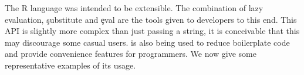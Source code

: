 \documentclass[review,nonacm,screen,acmsmall,anonymous=true]{acmart}
\newcommand{\mypara}[1]{\medskip\noindent\emph{#1}\xspace}
\newcommand{\authorcomment}[3]{\xspace\textcolor{#1}{{\bf #2} #3}\xspace}
\newcommand{\todo}[1]{\authorcomment{red}{TODO}{#1}}
\begin{document}













The R language was intended to be extensible. The combination of lazy
evaluation, \c{substitute} and \c{eval} are the tools given to
developers to this end. This API is slightly more complex than just
passing a string, it is conceivable that this may discourage some
casual users. \Eval is also being used to reduce boilerplate code and
provide convenience features for programmers. We now give some
representative examples of its usage.
\end{document}
